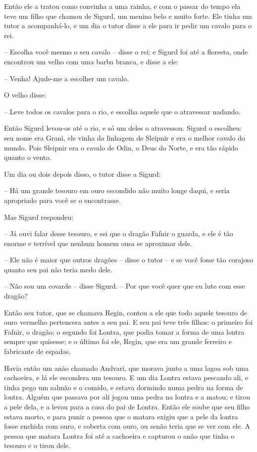Então ele a tratou como convinha a uma rainha, e com o passar do tempo
ela teve um filho que chamou de Sigurd, um menino belo e muito forte.
Ele tinha um tutor a acompanhá-lo, e um dia o tutor disse a ele para
ir pedir um cavalo para o rei. 

-- Escolha você mesmo o seu cavalo -- disse o rei; e Sigurd foi até a
floresta, onde encontrou um velho com uma barba branca, e disse a
ele:

-- Venha! Ajude-me a escolher um cavalo.

O velho disse:

-- Leve todos os cavalos para o rio, e escolha aquele que o atravessar
nadando. 

Então Sigurd levou-os até o rio, e só um deles o atravessou. Sigurd o
escolheu: seu nome era Grani, ele vinha da linhagem de Sleipnir e era
o melhor cavalo do mundo. Pois Sleipnir era o cavalo de Odin, o Deus
do Norte, e era tão rápido quanto o vento. 

Um dia ou dois depois disso, o tutor disse a Sigurd:

-- Há um grande tesouro em ouro escondido não muito longe daqui, e
seria apropriado para você se o encontrasse. 

Mas Sigurd respondeu:

-- Já ouvi falar desse tesouro, e sei que o dragão Fafnir o guarda, e
ele é tão enorme e terrível que nenhum homem ousa se aproximar dele.

-- Ele não é maior que outros dragões -- disse o tutor -- e se você fosse
tão corajoso quanto seu pai não teria medo dele. 

-- Não sou um covarde -- disse Sigurd. -- Por que você quer que eu lute
com esse dragão? 

Então seu tutor, que se chamava Regin, contou a ele que todo aquele
tesouro de ouro vermelho pertencera antes a seu pai. E seu pai teve
três filhos: o primeiro foi Fafnir, o dragão; o segundo foi Lontra,
que podia tomar a forma de uma lontra sempre que quisesse; e o último
foi ele, Regin, que era um grande ferreiro e fabricante de espadas. 

Havia então um anão chamado Andvari, que morava junto a uma lagoa sob
uma cachoeira, e lá ele escondera um tesouro. E um dia Lontra estava
pescando ali, e tinha pego um salmão e o comido, e estava dormindo
numa pedra na forma de lontra. Alguém que passava por ali jogou uma
pedra na lontra e a matou; e tirou a pele dela, e a levou para a casa
do pai de Lontra. Então ele soube que seu filho estava morto, e para
punir a pessoa que o matara exigiu que a pele da lontra fosse enchida
com ouro, e coberta com ouro, ou senão teria que se ver com ele. A
pessoa que matara Lontra foi até a cachoeira e capturou o anão que
tinha o tesouro e o tirou dele. 

